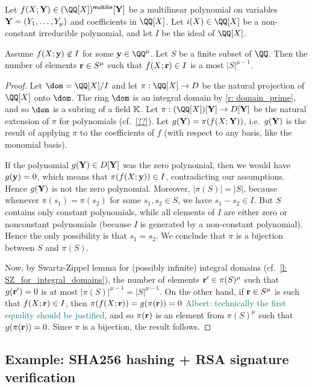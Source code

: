 \documentclass[11pt,letterpaper,usenames,dvipsnames]{article}
\newcommand{\albert}[1]{\textcolor{teal}{Albert: {#1}}}
\begin{document}
    \begin{lemma}
    Let $f(X;\YY) \in (\QQ[X])^{\multilin}[\YY]$ be a multilinear polynomial on variables $\mathbf{Y}= (Y_1,\ldots, Y_\mu)$ and coefficients in $\QQ[X]$. Let $i(X) \in \QQ[X]$ be a non-constant irreducible polynomial, and let $I$ be the ideal of $\QQ[X]$. 
    
    Assume $f(X;\mathbf{y})\not\in I$ for some $\yy\in \QQ^\mu$. Let $S$ be a finite subset of $\QQ$. Then the number of elements $\mathbf{r}\in S^\mu$ such that $f(X;\mathbf{r})\in I$ is a most $|S|^{\mu-1}$.
    \end{lemma}
    \begin{proof}
    Let $\dom= \QQ[X]/I$ and let  $\pi:\QQ[X] \to D$ be the natural projection of $\QQ[X]$ onto $\dom$. The ring $\dom$ is an integral domain by \cref{r: domain_prime}, and so $\dom$ is a subring of a field $\mathbb{K}$. Let $\pi:(\QQ[X])[\YY]\to D[\YY]$ be the natural extension of $\pi$ for polynomials (cf.\ \cref{??}). Let $g(\mathbf{Y}) = \pi(f(X;\mathbf{Y}))$, i.e.\ $g(\mathbf{Y})$ is the result of applying $\pi$ to the coefficients of $f$ (with respect to any basis, like the monomial basis). 
    
     If the polynomial $g(\mathbf{Y}) \in D[\mathbf{Y}]$ was the zero polynomial, then we would have $g(\mathbf{y}) = 0$, which means that $\pi(f(X;\mathbf{y}))\in I$, contradicting our assumptions. Hence $g(\mathbf{Y})$ is not the zero polynomial. Moreover, $|\pi(S)|=|S|$, because whenever $\pi(s_1) = \pi(s_2)$ for some $s_1,s_2\in S$, we have $s_1 - s_2 \in  I$. But $S$ contains only constant polynomials, while all elements of $I$ are either zero or nonconstant polynomials (because $I$ is generated by a non-constant polynomial). Hence the only possibility is that $s_1=s_2$.  We conclude that $\pi$ is a bijection between $S$ and $\pi(S)$.
     
     Now, by Swartz-Zippel lemma for (possibly infinite) integral domains (cf.\ \cref{l: SZ_for_integral_domains}), the number of elements $\mathbf{r}'\in \pi(S)^\mu$ such that $g(\mathbf{r}')=0$ is at most $|\pi(S)|^{\mu-1}= |S|^{\mu-1}$. On the other hand, if $\mathbf{r}\in S^\mu$ is such that $f(X;\mathbf{r})\in I$, then $\pi(f(X;\mathbf{r}))=g(\pi(\mathbf{r}))=0$ \albert{technically the first equality should be justified}, and so $\pi(\mathbf{r})$ is an element from $\pi(S)^{\mu}$ such that $g(\pi(\mathbf{r}))=0$. Since $\pi$ is a bijection, the result follows.
    \end{proof}

\subsection{Example: SHA256 hashing + RSA signature verification}
\end{document}
